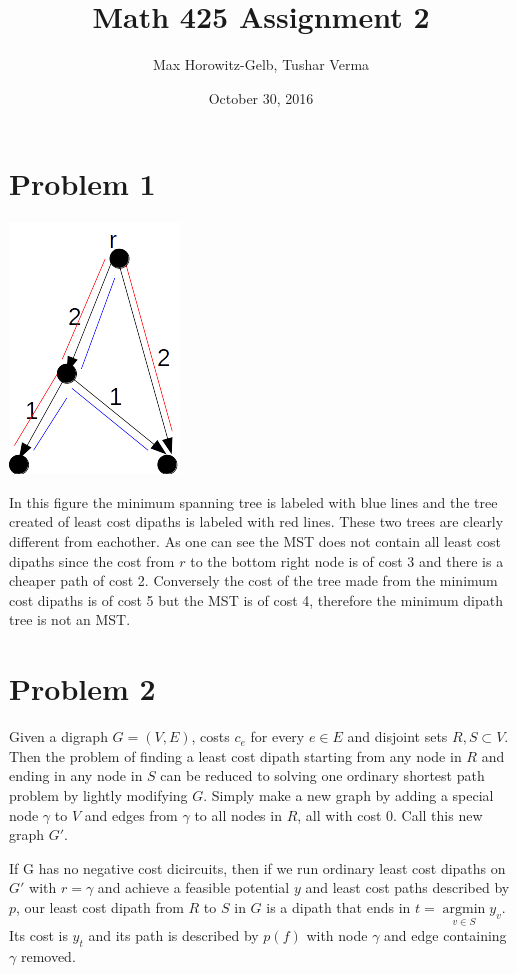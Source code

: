 \documentclass{article}
\title{Math 425 Assignment 2}
\author{Max Horowitz-Gelb, Tushar Verma}
\date{October 30, 2016}
\DeclareMathOperator*{\argmin}{argmin}
\begin{document}
\maketitle
\section*{Problem 1}
\includegraphics[scale=0.5]{tree}

In this figure the minimum spanning tree is labeled with blue lines and the tree created of least cost dipaths is labeled with red lines. These two trees are clearly different from eachother. As one can see the MST does not contain all least cost dipaths since the cost from $r$ to the bottom right node is of cost 3 and there is a cheaper path of cost 2. Conversely the cost of the tree made from the minimum cost dipaths is of cost 5 but the MST is of cost 4, therefore the minimum dipath tree is not an MST.
\section*{Problem 2}
Given a digraph $G = (V,E)$, costs $c_e$ for every $e \in E$ and disjoint sets $R,S \subset V$. Then the problem of finding a least cost dipath starting from any node in $R$ and ending in any node in $S$ can be reduced to solving one ordinary shortest path problem by lightly modifying $G$. Simply make a new graph by adding a special node $\gamma$ to $V$ and edges from $\gamma$ to all nodes in $R$, all with cost $0$. Call this new graph  $G'$.

If G has no negative cost dicircuits, then if we run ordinary least cost dipaths on $G'$ with $r = \gamma$ and achieve a feasible potential $y$ and least cost paths
described by 
$p$, our least cost dipath from $R$ to $S$ in $G$ is a dipath that ends in $t = \argmin\limits_{v \in S} y_v$. Its cost is $y_t$ and its path is described by $p(f)$ with node $\gamma$ and edge containing $\gamma$ removed.
\end{document}
